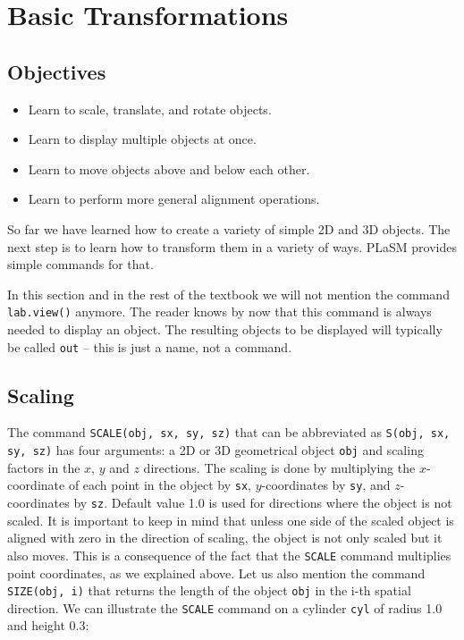 \section{Basic Transformations}

\subsection{Objectives}
\begin{itemize}
\item Learn to scale, translate, and rotate objects.
\item Learn to display multiple objects at once.
\item Learn to move objects above and below each other.
\item Learn to perform more general alignment operations.
\end{itemize}
So far we have learned how to create a variety of simple 2D and 3D objects. 
The next step is to learn how to transform them in a variety of ways. PLaSM
provides simple commands for that. 

\begin{gbox}
In this section and in the rest of the textbook we will not mention the command
{\tt lab.view()} anymore. The reader knows by now that this command is always needed 
to display an object. The resulting objects to be displayed will 
typically be called {\tt out} -- this is just a name, not a command.
\end{gbox}


\subsection{Scaling}

The command {\tt SCALE(obj, sx, sy, sz)} that can be abbreviated as 
{\tt S(obj, sx, sy, sz)} has four arguments: a 2D or 3D geometrical object {\tt obj} 
and scaling factors in the $x$, $y$ and $z$ directions. The scaling is done by
multiplying the $x$-coordinate of each point in the object by {\tt sx}, $y$-coordinates
by {\tt sy}, and $z$-coordinates by {\tt sz}. Default value 1.0 is used for directions where 
the object is not scaled. It is important to keep in mind that unless 
one side of the scaled object is aligned with zero in the direction of scaling, 
the object is not only scaled but it also moves. This is a consequence of the 
fact that the {\tt SCALE} command multiplies point coordinates, as we explained above. 
Let us also mention the command {\tt SIZE(obj, i)} that returns the length of 
the object {\tt obj} in the i-th spatial direction.
We can illustrate the {\tt SCALE} command on a cylinder {\tt cyl} of radius 1.0 
and height 0.3:

